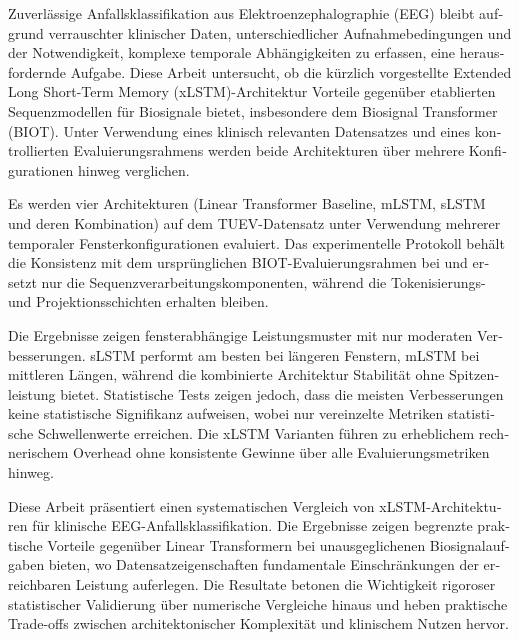 


\cleardoubleoddpage%
\begin{otherlanguage}{ngerman}
\begin{abstract*}
Zuverlässige Anfallsklassifikation aus Elektroenzephalographie (EEG) bleibt aufgrund verrauschter klinischer Daten, unterschiedlicher Aufnahmebedingungen und der Notwendigkeit, komplexe temporale Abhängigkeiten zu erfassen, eine herausfordernde Aufgabe. Diese Arbeit untersucht, ob die kürzlich vorgestellte Extended Long Short-Term Memory (xLSTM)-Architektur Vorteile gegenüber etablierten Sequenzmodellen für Biosignale bietet, insbesondere dem Biosignal Transformer (BIOT). Unter Verwendung eines klinisch relevanten Datensatzes und eines kontrollierten Evaluierungsrahmens werden beide Architekturen über mehrere Konfigurationen hinweg verglichen.

Es werden vier Architekturen (Linear Transformer Baseline, \ac{mLSTM}, \ac{sLSTM} und deren Kombination) auf dem \ac{TUEV}-Datensatz unter Verwendung mehrerer temporaler Fensterkonfigurationen evaluiert. Das experimentelle Protokoll behält die Konsistenz mit dem ursprünglichen \ac{BIOT}-Evaluierungsrahmen bei und ersetzt nur die Sequenzverarbeitungskomponenten, während die Tokenisierungs- und Projektionsschichten erhalten bleiben.

Die Ergebnisse zeigen fensterabhängige Leistungsmuster mit nur moderaten Verbesserungen. \ac{sLSTM} performt am besten bei längeren Fenstern, \ac{mLSTM} bei mittleren Längen, während die kombinierte Architektur Stabilität ohne Spitzenleistung bietet. Statistische Tests zeigen jedoch, dass die meisten Verbesserungen keine statistische Signifikanz aufweisen, wobei nur vereinzelte Metriken statistische Schwellenwerte erreichen. Die \ac{xLSTM} Varianten führen zu erheblichem rechnerischem Overhead ohne konsistente Gewinne über alle Evaluierungsmetriken hinweg.

Diese Arbeit präsentiert einen systematischen Vergleich von \ac{xLSTM}-Architekturen für klinische \ac{EEG}-Anfallsklassifikation. Die Ergebnisse zeigen begrenzte praktische Vorteile gegenüber Linear Transformern bei unausgeglichenen Biosignalaufgaben bieten, wo Datensatzeigenschaften fundamentale Einschränkungen der erreichbaren Leistung auferlegen. Die Resultate betonen die Wichtigkeit rigoroser statistischer Validierung über numerische Vergleiche hinaus und heben praktische Trade-offs zwischen architektonischer Komplexität und klinischem Nutzen hervor.
\end{abstract*}
\end{otherlanguage}
